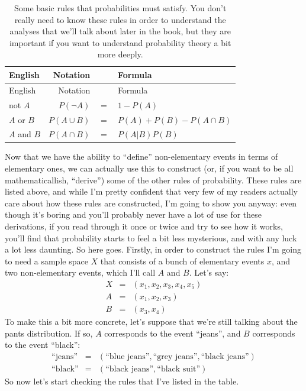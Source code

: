 \documentclass[
  letterpaper,
  DIV=11,
  numbers=noendperiod]{scrreprt}
\begin{document}
\begin{longtable}[]{@{}lrll@{}}
\caption{Some basic rules that probabilities must satisfy. You don't
really need to know these rules in order to understand the analyses that
we'll talk about later in the book, but they are important if you want
to understand probability theory a bit more deeply.}\tabularnewline
\toprule\noalign{}
English & Notation & & Formula \\
\midrule\noalign{}
\endfirsthead
\toprule\noalign{}
English & Notation & & Formula \\
\midrule\noalign{}
\endhead
\bottomrule\noalign{}
\endlastfoot
not \(A\) & \(P(\neg A)\) & \(=\) & \(1-P(A)\) \\
\(A\) or \(B\) & \(P(A \cup B)\) & \(=\) &
\(P(A) + P(B) - P(A \cap B)\) \\
\(A\) and \(B\) & \(P(A \cap B)\) & \(=\) & \(P(A|B) P(B)\) \\
\end{longtable}

Now that we have the ability to ``define'' non-elementary events in
terms of elementary ones, we can actually use this to construct (or, if
you want to be all mathematicallish, ``derive'') some of the other rules
of probability. These rules are listed above, and while I'm pretty
confident that very few of my readers actually care about how these
rules are constructed, I'm going to show you anyway: even though it's
boring and you'll probably never have a lot of use for these
derivations, if you read through it once or twice and try to see how it
works, you'll find that probability starts to feel a bit less
mysterious, and with any luck a lot less daunting. So here goes.
Firstly, in order to construct the rules I'm going to need a sample
space \(X\) that consists of a bunch of elementary events \(x\), and two
non-elementary events, which I'll call \(A\) and \(B\). Let's say:
\[\begin{array}{rcl}
X &=& (x_1, x_2, x_3, x_4, x_5) \\
A &=& (x_1, x_2, x_3) \\
B &=& (x_3, x_4)
\end{array}\] To make this a bit more concrete, let's suppose that we're
still talking about the pants distribution. If so, \(A\) corresponds to
the event ``jeans'', and \(B\) corresponds to the event ``black'':
\[\begin{array}{rcl}
\mbox{``jeans''} &=& (\mbox{``blue jeans''}, \mbox{``grey jeans''}, \mbox{``black jeans''}) \\
\mbox{``black''} &=& (\mbox{``black jeans''}, \mbox{``black suit''})
\end{array}\] So now let's start checking the rules that I've listed in
the table.
\end{document}
